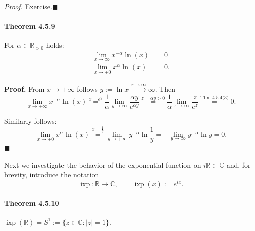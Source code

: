 \documentclass[12pt]{article}
\begin{document}
	\emph{Proof.} Exercise.\hfill $\blacksquare$

\paragraph*{Theorem 4.5.9} For $\alpha \in \mathbb{R}_{>0}$ holds:
\begin{align*}
    \lim_{x \to \infty} x^{-\alpha} \ln(x) &= 0 \\
    \lim_{x \to +0} x^{\alpha} \ln(x) &= 0.
\end{align*}

\textbf{Proof.} From $x \to +\infty$ follows $y := \ln x \xrightarrow{x \to \infty} \infty$. Then
\[
\lim_{x \to +\infty} x^{-\alpha} \ln(x) 
\stackrel{x=e^y}{=} \frac{1}{\alpha} \lim_{y \to \infty} \frac{\alpha y}{e^{\alpha y}} 
\stackrel{z=\alpha y > 0}{=} \frac{1}{\alpha} \lim_{z \to \infty} \frac{z}{e^z} 
\stackrel{\text{Thm 4.5.4(3)}}{=} 0.
\]

Similarly follows:
\[
\lim_{x \to +0} x^{\alpha} \ln(x) 
\stackrel{x=\frac{1}{y}}{=} \lim_{y \to +\infty} y^{-\alpha} \ln \frac{1}{y} 
= - \lim_{y \to \infty} y^{-\alpha} \ln y = 0.
\]
\hfill $\blacksquare$


	Next we investigate the behavior of the exponential function on $i\mathbb R \subset \mathbb C$ and, for brevity, introduce the notation
	\[
		\operatorname{ixp} : \mathbb R \to \mathbb C,\qquad \operatorname{ixp}(x) := e^{ix}.
	\]

	\paragraph{Theorem 4.5.10} $\operatorname{ixp}(\mathbb R) = S^{1} := \{ z\in\mathbb C : |z| = 1\}$.
\end{document}
